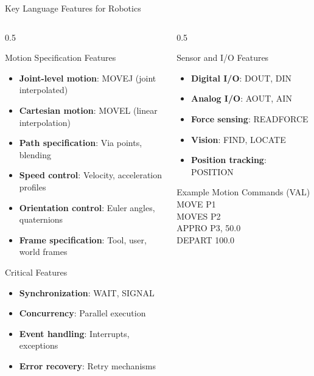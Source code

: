 \documentclass[10pt,aspectratio=169]{beamer}
\begin{document}
\begin{frame}{Key Language Features for Robotics}
\begin{columns}[T]
\begin{column}{0.5\textwidth}
\begin{block}{Motion Specification Features}
\begin{itemize}
\item \textbf{Joint-level motion}: MOVEJ (joint interpolated)
\item \textbf{Cartesian motion}: MOVEL (linear interpolation)
\item \textbf{Path specification}: Via points, blending
\item \textbf{Speed control}: Velocity, acceleration profiles
\item \textbf{Orientation control}: Euler angles, quaternions
\item \textbf{Frame specification}: Tool, user, world frames
\end{itemize}
\end{block}
\begin{alertblock}{Critical Features}
\begin{itemize}
\item \textbf{Synchronization}: WAIT, SIGNAL
\item \textbf{Concurrency}: Parallel execution
\item \textbf{Event handling}: Interrupts, exceptions
\item \textbf{Error recovery}: Retry mechanisms
\end{itemize}
\end{alertblock}
\end{column}
\begin{column}{0.5\textwidth}
\begin{block}{Sensor and I/O Features}
\begin{itemize}
\item \textbf{Digital I/O}: DOUT, DIN
\item \textbf{Analog I/O}: AOUT, AIN
\item \textbf{Force sensing}: READFORCE
\item \textbf{Vision}: FIND, LOCATE
\item \textbf{Position tracking}: POSITION
\end{itemize}
\end{block}
\begin{exampleblock}{Example Motion Commands (VAL)}
\ttfamily
MOVE P1\\
MOVES P2\\
APPRO P3, 50.0\\
DEPART 100.0
\end{exampleblock}
\end{column}
\end{columns}
\end{frame}
\end{document}
